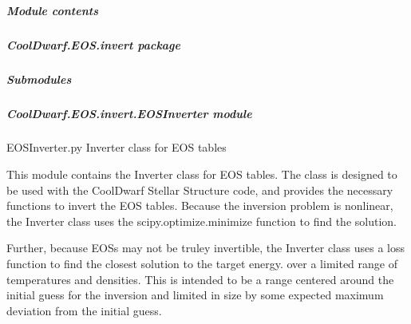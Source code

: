 \documentclass[letterpaper,10pt,english]{sphinxmanual}
\begin{document}
\begin{fulllineitems}
\begin{fulllineitems}
\begin{quote}
\begin{description}
\begin{description}
\end{description}

\end{description}\end{quote}

\end{fulllineitems}


\end{fulllineitems}



\subparagraph{Module contents}
\label{\detokenize{CoolDwarf.EOS.ChabrierDebras2021:module-CoolDwarf.EOS.ChabrierDebras2021}}\label{\detokenize{CoolDwarf.EOS.ChabrierDebras2021:module-contents}}
\sphinxstepscope


\subparagraph{CoolDwarf.EOS.invert package}
\label{\detokenize{CoolDwarf.EOS.invert:cooldwarf-eos-invert-package}}\label{\detokenize{CoolDwarf.EOS.invert::doc}}

\subparagraph{Submodules}
\label{\detokenize{CoolDwarf.EOS.invert:submodules}}

\subparagraph{CoolDwarf.EOS.invert.EOSInverter module}
\label{\detokenize{CoolDwarf.EOS.invert:module-CoolDwarf.EOS.invert.EOSInverter}}\label{\detokenize{CoolDwarf.EOS.invert:cooldwarf-eos-invert-eosinverter-module}}
\sphinxAtStartPar
EOSInverter.py \textendash{} Inverter class for EOS tables

\sphinxAtStartPar
This module contains the Inverter class for EOS tables. The class is designed to be used with the CoolDwarf Stellar Structure code, and provides the necessary functions to invert the EOS tables.
Because the inversion problem is non\sphinxhyphen{}linear, the Inverter class uses the scipy.optimize.minimize function to find the solution.

\sphinxAtStartPar
Further, because EOSs may not be truley invertible, the Inverter class uses a loss function to find the closest solution to the target energy.
over a limited range of temperatures and densities. This is intended to be a range centered around the initial guess for the inversion and
limited in size by some expected maximum deviation from the initial guess.
\end{document}

